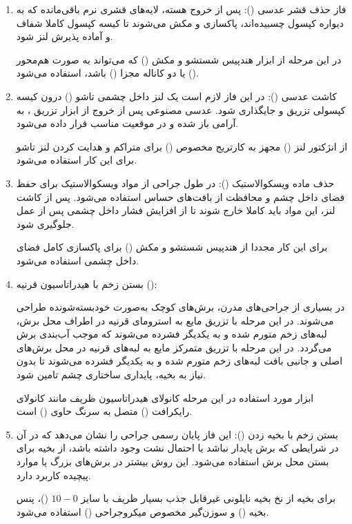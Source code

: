 \documentclass{article}
\begin{document}
\begin{enumerate}
\item فاز حذف قشر عدسی ():
پس از خروج هسته، لایه‌های قشری نرم باقی‌مانده که به دیواره کپسول چسبیده‌اند، پاکسازی و مکش می‌شوند تا کیسه کپسول کاملا شفاف و آماده پذیرش لنز شود.

در این مرحله از ابزار هندپیس شستشو و مکش () که می‌تواند به صورت هم‌محور () یا دو کاناله مجزا () باشد، استفاده می‌شود.

\item کاشت عدسی ():
در این فاز لازم است یک لنز داخل چشمی تاشو () درون کیسه کپسولی تزریق و جایگذاری شود. عدسی مصنوعی پس از خروج از ابزار تزریق ، به آرامی باز شده و در موقعیت مناسب قرار داده می‌شود.

از انژکتور لنز () مجهز به کارتریج مخصوص () برای متراکم و هدایت کردن لنز تاشو برای این کار استفاده می‌شود.

\item حذف ماده ویسکوالاستیک ():
در طول جراحی از مواد ویسکوالاستیک برای حفظ فضای داخل چشم و محافظت از بافت‌های حساس استفاده می‌شود. پس از کاشت لنز، این مواد باید کاملا خارج شوند تا از افزایش فشار داخل چشمی پس از عمل جلوگیری شود.

برای این کار مجددا از هندپیس شستشو و مکش () برای پاکسازی کامل فضای داخل چشمی استفاده می‌شود.

\item بستن زخم با هیدراتاسیون قرنیه ():

در بسیاری از جراحی‌های مدرن، برش‌های کوچک به‌صورت خودبسته‌شونده طراحی می‌شوند. در این مرحله با تزریق مایع به استرومای قرنیه در اطراف محل برش، لبه‌های زخم متورم شده و به یکدیگر فشرده می‌شوند که موجب آب‌بندی برش می‌گردد.
در این مرحله با تزریق متمرکز مایع به لبه‌های قرنیه در محل برش‌های اصلی و جانبی بافت لبه‌های زخم متورم شده و به یکدیگر فشرده می‌شوند تا بدون نیاز به بخیه، پایداری ساختاری چشم تامین شود.

ابزار مورد استفاده در این مرحله کانولای هیدراتاسیون ظریف مانند کانولای رایکرافت () متصل به سرنگ حاوی () است.

\item بستن زخم با بخیه زدن ():
این فاز پایان رسمی جراحی را نشان می‌دهد که در آن در شرایطی که برش پایدار نباشد یا احتمال نشت وجود داشته باشد، از بخیه برای بستن محل برش استفاده می‌شود. این روش بیشتر در برش‌های بزرگ یا موارد پیچیده کاربرد دارد.

برای بخیه از نخ بخیه نایلونی غیرقابل جذب بسیار ظریف با سایز $10-0$ ()، پنس بخیه () و سوزن‌گیر مخصوص میکروجراحی () استفاده می‌شود.
\end{enumerate}
\end{document}

